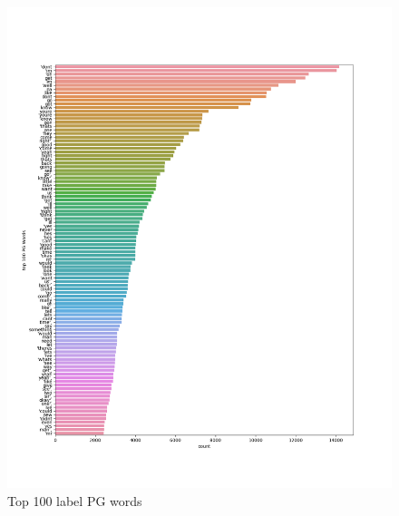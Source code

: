 \documentclass[a4paper]{article}
\begin{document}
\begin{figure}[ht]
    \centering
    \includegraphics[width=1\textwidth]{../stats/top_100_PG_words.png}
    \caption{Top 100 label PG words}
\end{figure}
\end{document}
